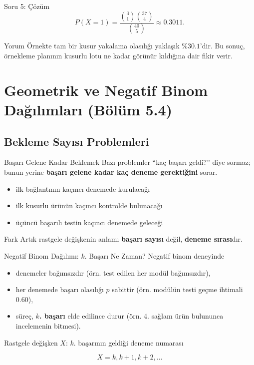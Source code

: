 \documentclass[light]{lutbeamer}
\begin{document}
\begin{frame}{Soru 5: Çözüm}
    \small
    \[
    P(X=1)=\frac{\binom{3}{1}\binom{37}{4}}{\binom{40}{5}}\approx 0.3011.
    \]

    \begin{exampleblock}{Yorum}
        Örnekte tam bir kusur yakalama olasılığı yaklaşık \(\%30.1\)'dir. Bu sonuç, örnekleme planının kusurlu lotu ne kadar görünür kıldığına dair fikir verir.
    \end{exampleblock}
\end{frame}

\section{Geometrik ve Negatif Binom Dağılımları (Bölüm 5.4)}
\subsection{Bekleme Sayısı Problemleri}

\begin{frame}{Başarı Gelene Kadar Beklemek}
    \small
    Bazı problemler ``kaç başarı geldi?'' diye sormaz; bunun yerine
    \textbf{başarı gelene kadar kaç deneme gerektiğini} sorar.

    \begin{itemize}
        \item ilk bağlantının kaçıncı denemede kurulacağı
        \item ilk kusurlu ürünün kaçıncı kontrolde bulunacağı
        \item üçüncü başarılı testin kaçıncı denemede geleceği
    \end{itemize}

    \begin{block}{Fark}
        Artık rastgele değişkenin anlamı \textbf{başarı sayısı} değil, \textbf{deneme sırası}dır.
    \end{block}
\end{frame}

\begin{frame}{Negatif Binom Dağılımı: \(k\). Başarı Ne Zaman?}
    \small
    Negatif binom deneyinde
    \begin{itemize}
        \item denemeler bağımsızdır (örn. test edilen her modül bağımsızdır),
        \item her denemede başarı olasılığı \(p\) sabittir (örn. modülün testi geçme ihtimali \(0.60\)),
        \item süreç, \textbf{\(k\). başarı} elde edilince durur (örn. \(4\). sağlam ürün bulununca incelemenin bitmesi).
    \end{itemize}

    \begin{block}{Rastgele değişken}
        \(X\): \(k\). başarının geldiği deneme numarası
    \end{block}

    \[
    X = k,k+1,k+2,\dots
    \]
\end{frame}
\end{document}
